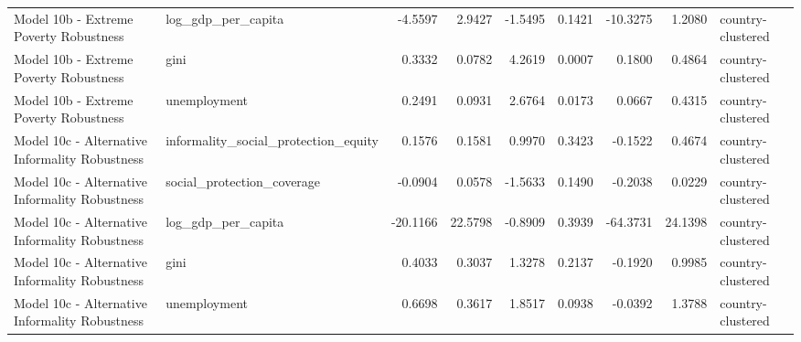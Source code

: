 \begin{tabular}{llrrrrrrl}
Model 10b - Extreme Poverty Robustness & log\_gdp\_per\_capita & -4.5597 & 2.9427 & -1.5495 & 0.1421 & -10.3275 & 1.2080 & country-clustered\\
Model 10b - Extreme Poverty Robustness & gini & 0.3332 & 0.0782 & 4.2619 & 0.0007 & 0.1800 & 0.4864 & country-clustered\\
\addlinespace
Model 10b - Extreme Poverty Robustness & unemployment & 0.2491 & 0.0931 & 2.6764 & 0.0173 & 0.0667 & 0.4315 & country-clustered\\
Model 10c - Alternative Informality Robustness & informality\_social\_protection\_equity & 0.1576 & 0.1581 & 0.9970 & 0.3423 & -0.1522 & 0.4674 & country-clustered\\
Model 10c - Alternative Informality Robustness & social\_protection\_coverage & -0.0904 & 0.0578 & -1.5633 & 0.1490 & -0.2038 & 0.0229 & country-clustered\\
Model 10c - Alternative Informality Robustness & log\_gdp\_per\_capita & -20.1166 & 22.5798 & -0.8909 & 0.3939 & -64.3731 & 24.1398 & country-clustered\\
Model 10c - Alternative Informality Robustness & gini & 0.4033 & 0.3037 & 1.3278 & 0.2137 & -0.1920 & 0.9985 & country-clustered\\
\addlinespace
Model 10c - Alternative Informality Robustness & unemployment & 0.6698 & 0.3617 & 1.8517 & 0.0938 & -0.0392 & 1.3788 & country-clustered\\
\bottomrule
\end{tabular}
